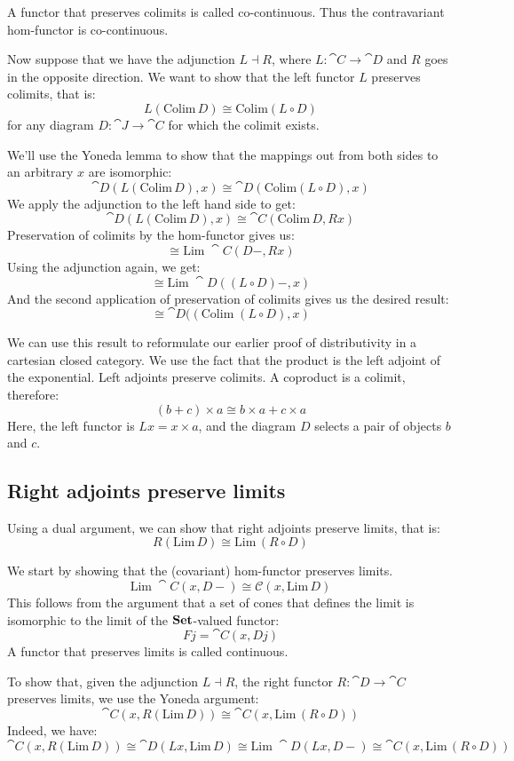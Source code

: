 \documentclass[DaoFP]{subfiles}
\begin{document}
A functor that preserves colimits is called co-continuous. Thus the contravariant hom-functor is co-continuous.

Now suppose that we have the adjunction $L \dashv R$, where $L \colon \cat C \to \cat D$ and $R$ goes in the opposite direction. We want to show that the left functor $L$ preserves colimits, that is:
\[ L (\text{Colim} \, D) \cong \text{Colim} (L \circ D) \]
for any diagram $D \colon \cat J \to \cat C$ for which the colimit exists.

We'll use the Yoneda lemma to show that the mappings out from both sides to an arbitrary $x$ are isomorphic:
\[ \cat D( L (\text{Colim} \, D), x) \cong \cat D (\text{Colim} (L \circ D), x) \]
We apply the adjunction to the left hand side to get:
\[ \cat D( L (\text{Colim} \, D), x) \cong \cat C (\text{Colim}\, D, R x) \]
Preservation of colimits by the hom-functor gives us:
\[ \cong \text{Lim}\; \cat C(D -, R x) \]
Using the adjunction again, we get:
\[ \cong \text{Lim}\; \cat D((L \circ D) -, x) \]
And the second application of preservation of colimits gives us the desired result:
\[ \cong  \cat D((\text{Colim}\;(L \circ D), x) \]

We can use this result to reformulate our earlier proof of distributivity in a cartesian closed category. We use the fact that the product is the left adjoint of the exponential. Left adjoints preserve colimits. A coproduct is a colimit, therefore:
\[(b + c) \times a \cong b \times a + c \times a \]
Here, the left functor is $L x = x \times a$, and the diagram $D$ selects a pair of objects $b$ and $c$. 

\subsection{Right adjoints preserve limits}
Using a dual argument, we can show that right adjoints preserve limits, that is:
\[ R (\text{Lim}\, D) \cong \text{Lim}\, (R \circ D) \]

We start by showing that the (covariant) hom-functor preserves limits. 
\[ \text{Lim}\; \cat C( x, D-) \cong \mathcal{C}(x, \text{Lim}\,D) \]
This follows from the argument that a set of cones that defines the limit is isomorphic to the limit of the $\mathbf{Set}$-valued functor:
\[ F j = \cat C(x, D j) \]
A functor that preserves limits is called continuous.

To show that, given the adjunction $L \dashv R$, the right functor $R \colon \cat D \to \cat C$ preserves limits, we use the Yoneda argument:
\[ \cat C(x, R (\text{Lim}\, D)) \cong \cat C (x, \text{Lim}\, (R \circ D)) \]
Indeed, we have:
\[ \cat C(x, R (\text{Lim}\, D)) \cong \cat D(L x, \text{Lim}\, D) \cong \text{Lim}\; \cat D(L x, D-) \cong \cat C(x, \text{Lim}\, (R \circ D))\]
\end{document}
